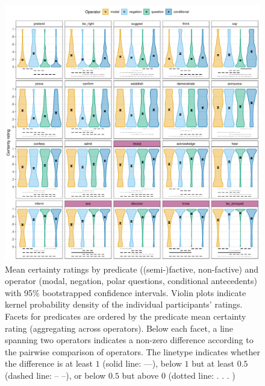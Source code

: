 \documentclass[a4paper,12pt,twoside]{article}
\begin{document}
         \begin{figure}[ht!]
            \centering
    		\includegraphics[width = .9\linewidth]{analysis.pdf}
    		\caption{Mean certainty ratings by predicate (\textcolor{pred-fcv-color}{(semi-)factive}, non-factive) and operator (\textcolor{op-m-color}{modal},  \textcolor{op-n-color}{negation}, \textcolor{op-q-color}{polar questions}, \textcolor{op-c-color}{conditional antecedents}) with 95\% bootstrapped confidence intervals. Violin plots indicate kernel probability density of the individual participants' ratings. Facets for predicates are ordered by the predicate mean certainty rating (aggregating across operators). Below each facet, a line spanning two operators indicates a non-zero difference according to the pairwise comparison of operators. The linetype indicates whether the difference is
            at least $1$ (solid line: —),
            below $1$ but at least $0.5$ (dashed line: – –),
            or below $0.5$ but above $0$ (dotted line: . . . )}
    		\label{fig:op-pred-analysis}
    	\end{figure}

        
        
\end{document}
